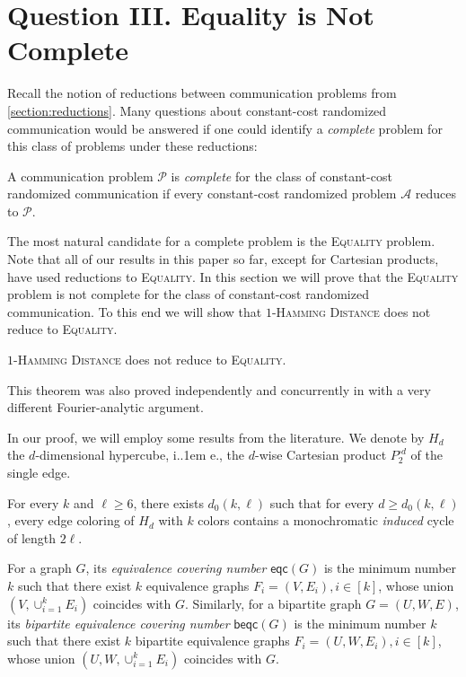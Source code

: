 \documentclass{theoretics}
\makeatletter
\newcommand{\cA}{\ensuremath{\mathcal{A}}}
\newcommand{\cP}{\ensuremath{\mathcal{P}}}
\newcommand{\eqc}{\mathsf{eqc}}
\newcommand{\beqc}{\mathsf{beqc}}
\newcommand*\ie{i.\kern.1em e.\@\xspace} %
\newcommand*\EQUALITY{\textsc{Equality}\xspace}
\makeatother
\begin{document}
\section{Question III. Equality is Not Complete}
\label{section:equality}

Recall the notion of reductions between communication problems from \cref{section:reductions}.
Many questions about constant-cost randomized communication would be answered if one could identify
a \emph{complete} problem for this class of problems under these reductions:

\begin{definition}
A communication problem $\cP$ is \emph{complete} for the class of constant-cost randomized
communication if every constant-cost randomized problem $\cA$ reduces to $\cP$.
\end{definition}

The most natural candidate for a complete problem is the \EQUALITY problem. Note that all of our
results in this paper so far, except for Cartesian products, have used reductions to \EQUALITY.  In
this section we will prove that the \EQUALITY problem is not complete for the class of constant-cost
randomized communication.  To this end we will show that \textsc{$1$-Hamming Distance} does not
reduce to \EQUALITY. 

\begin{theorem}
\label{thm:1hd-to-eq}
  \textsc{$1$-Hamming Distance} does not reduce to \textsc{Equality}.
\end{theorem}

This theorem was also proved independently and concurrently in \cite{HHH23dimfree} with a very
different Fourier-analytic argument.

In our proof, we will employ some results from the literature.  We denote by $H_d$ the
$d$-dimensional hypercube, \ie, the $d$-wise Cartesian product $P_2^{\square d}$ of the single edge. 

\begin{theorem}\label{hypercubeColoring}
	For every $k$ and $\ell \geq 6$, there exists $d_0(k,\ell)$ such that 
	for every $d \geq d_0(k,\ell)$, every edge coloring of $H_d$ with $k$
	colors contains a monochromatic \emph{induced}  cycle of length $2 \ell$.
\end{theorem}

For a graph $G$, its \emph{equivalence covering number} $\eqc(G)$ is the minimum number $k$ such that there exist $k$ equivalence graphs $F_i=(V,E_i), i \in [k]$, whose union $(V, \cup_{i=1}^k E_i)$ coincides with $G$.
Similarly, for a bipartite graph $G=(U,W,E)$,
its \emph{bipartite equivalence covering number}
$\beqc(G)$ is the minimum number $k$ such that there exist $k$ bipartite equivalence graphs $F_i=(U,W,E_i), i \in [k]$, whose union $(U,W, \cup_{i=1}^k E_i)$ coincides with $G$.
\end{document}
